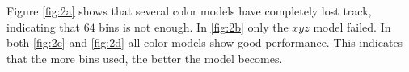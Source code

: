 \documentclass[11pt]{article}
\begin{document}
Figure \ref{fig:2a} shows that several color models have completely lost track,
indicating that $64$ bins is not enough. In \ref{fig:2b} only the $xyz$ model failed.
In both \ref{fig:2c} and \ref{fig:2d} all color models show good performance.
This indicates that the more bins used, the better the model becomes.

\begin{figure}[h!]
\centering
{}
\\
\end{figure}
\end{document}

